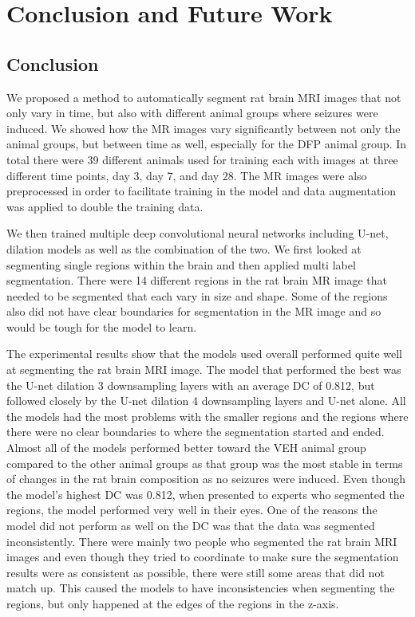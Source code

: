 \chapter{Conclusion and Future Work}
\section{Conclusion}
    We proposed a method to automatically segment rat brain MRI images that not only vary in time, but also with different animal groups where seizures were induced. 
    We showed how the MR images vary significantly between not only the animal groups, but between time as well, especially for the DFP animal group. 
    In total there were 39 different animals used for training each with images at three different time points, day 3, day 7, and day 28. 
    The MR images were also preprocessed in order to facilitate training in the model and data augmentation was applied to double the training data.
    
    We then trained multiple deep convolutional neural networks including U-net, dilation models as well as the combination of the two. 
    We first looked at segmenting single regions within the brain and then applied multi label segmentation. 
    There were 14 different regions in the rat brain MR image that needed to be segmented that each vary in size and shape. 
    Some of the regions also did not have clear boundaries for segmentation in the MR image and so would be tough for the model to learn. 
    
    The experimental results show that the models used overall performed quite well at segmenting the rat brain MRI image. 
    The model that performed the best was the U-net dilation 3 downsampling layers with an average DC of 0.812, but followed closely by the U-net dilation 4 downsampling layers and U-net alone. 
    All the models had the most problems with the smaller regions and the regions where there were no clear boundaries to where the segmentation started and ended. 
    Almost all of the models performed better toward the VEH animal group compared to the other animal groups as that group was the most stable in terms of changes in the rat brain composition as no seizures were induced.
    Even though the model's highest DC was 0.812, when presented to experts who segmented the regions, the model performed very well in their eyes.
    One of the reasons the model did not perform as well on the DC was that the data was segmented inconsistently.
    There were mainly two people who segmented the rat brain MRI images and even though they tried to coordinate to make sure the segmentation results were as consistent as possible, there were still some areas that did not match up.
    This caused the models to have inconsistencies when segmenting the regions, but only happened at the edges of the regions in the z-axis. 
    

